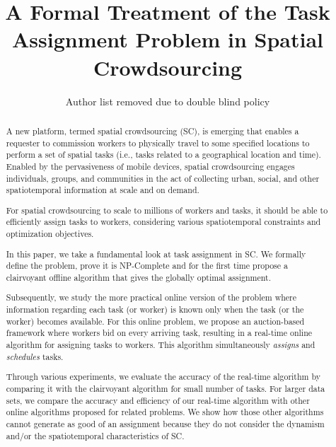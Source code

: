 \documentclass{sig-alternate}
\title{A Formal Treatment of the Task Assignment Problem in Spatial Crowdsourcing}
\begin{document}
\author{Author list removed due to double blind policy}

\maketitle
\begin{abstract}
A new platform, termed spatial crowdsourcing (SC), is emerging that enables a requester to commission workers to physically travel to some specified locations to perform a set of spatial tasks (i.e., tasks related to a geographical location and time). Enabled by the pervasiveness of mobile devices, spatial crowdsourcing engages individuals, groups, and communities in the act of collecting urban, social, and other spatiotemporal information at scale and on demand.

For spatial crowdsourcing to scale to millions of workers and tasks, it should be able to efficiently assign tasks to workers, considering various spatiotemporal constraints and optimization objectives.

In this paper, we take a fundamental look at task assignment in SC. We formally define the problem, prove it is NP-Complete and for the first time propose a clairvoyant offline algorithm that gives the globally optimal assignment. 

Subsequently, we study the more practical online version of the problem where information regarding each task (or worker) is known only when the task (or the worker) becomes available. For this online problem, we propose an auction-based framework where workers bid on every arriving task, resulting in a real-time online algorithm for assigning tasks to workers. This algorithm simultaneously \emph{assigns} and \emph{schedules} tasks. 

Through various experiments, we evaluate the accuracy of the real-time algorithm by comparing it with the clairvoyant algorithm for small number of tasks. For larger data sets, we compare the accuracy and efficiency of our real-time algorithm with other online algorithms proposed for related problems. We show how those other algorithms cannot generate as good of an assignment because they do not consider the dynamism and/or the spatiotemporal characteristics of SC.


\end{abstract}
\end{document}

